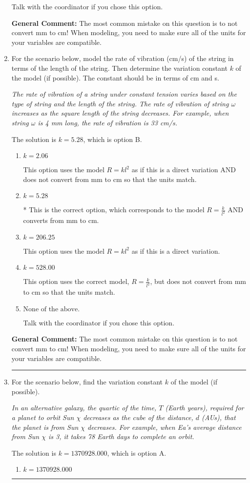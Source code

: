 \documentclass{extbook}[14pt]
\newcommand{\litem}[1]{\item #1

\rule{\textwidth}{0.4pt}}
\begin{document}
\begin{enumerate}
{\begin{enumerate}[label=\Alph*.]
Talk with the coordinator if you chose this option.
\end{enumerate}

\textbf{General Comment:} The most common mistake on this question is to not convert mm to cm! When modeling, you need to make sure all of the units for your variables are compatible.
}
\litem{
For the scenario below, model the rate of vibration (cm/s) of the string in terms of the length of the string. Then determine the variation constant $k$ of the model (if possible). The constant should be in terms of cm and s.

\begin{center}
    \textit{ The rate of vibration of a string under constant tension varies based on the type of string and the length of the string. The rate of vibration of string $\omega$ increases as the square length of the string decreases. For example, when string $\omega$ is 4 mm long, the rate of vibration is 33 cm/s. }
\end{center}
The solution is \( k = 5.28 \), which is option B.\begin{enumerate}[label=\Alph*.]
\item \( k = 2.06 \)

This option uses the model $R = kl^{2}$ as if this is a direct variation AND does not convert from mm to cm so that the units match.
\item \( k = 5.28 \)

* This is the correct option, which corresponds to the model $R = \frac{k}{l^{2}}$ AND converts from mm to cm.
\item \( k = 206.25 \)

This option uses the model $R = kl^{2}$ as if this is a direct variation.
\item \( k = 528.00 \)

This option uses the correct model, $R = \frac{k}{l^{2}}$, but does not convert from mm to cm so that the units match.
\item \( \text{None of the above.} \)

Talk with the coordinator if you chose this option.
\end{enumerate}

\textbf{General Comment:} The most common mistake on this question is to not convert mm to cm! When modeling, you need to make sure all of the units for your variables are compatible.
}
\litem{
For the scenario below, find the variation constant $k$ of the model (if possible).

\begin{center}
    \textit{ In an alternative galaxy, the quartic of the time, $T$ (Earth years), required for a planet to orbit Sun $\chi$ decreases as the cube of the distance, $d$ (AUs), that the planet is from Sun $\chi$ decreases. For example, when Ea's average distance from Sun $\chi$ is 3, it takes 78 Earth days to complete an orbit. }
\end{center}
The solution is \( k = 1370928.000 \), which is option A.\begin{enumerate}[label=\Alph*.]
\item \( k = 1370928.000 \)


\end{enumerate}}
\end{enumerate}
\end{document}
